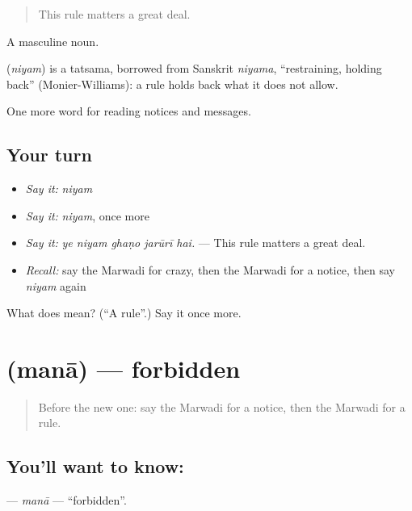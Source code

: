 \begin{quote}
This rule matters a great deal.
\end{quote}

A masculine noun.

\begin{cousinweb}
\textbf{} (\emph{niyam}) is a tatsama, borrowed from Sanskrit \emph{niyama}, \textquotedblleft{}restraining, holding back\textquotedblright{} (Monier-Williams): a rule holds back what it does not allow.
\end{cousinweb}

\begin{grammarlens}[title={What you've built}]
One more word for reading notices and messages.
\end{grammarlens}

\subsection*{Your turn}
\begin{itemize}
\raggedright
  \item \emph{Say it:} \emph{niyam}
  \item \emph{Say it:} \emph{niyam}, once more
  \item \emph{Say it:} \emph{ye niyam ghaṇo jarūrī hai.} — This rule matters a great deal.
  \item \emph{Recall:} say the Marwadi for crazy, then the Marwadi for a notice, then say \emph{niyam} again
\end{itemize}

\begin{tcolorbox}[breakable,colback=teal!4,colframe=teal!35!black,title={Before you move on}]
What does  mean? (\textquotedblleft{}A rule\textquotedblright{}.) Say it once more.
\end{tcolorbox}
\section[\texorpdfstring{\mw{मना} (manā)}{मना (manā)}]{ (manā) — forbidden}

\label{lesson:MW-C191-mana}



\begin{quote}
Before the new one: say the Marwadi for a notice, then the Marwadi for a rule.
\end{quote}

\subsection*{You'll want to know: }
\textbf{} — \emph{manā} — \textquotedblleft{}forbidden\textquotedblright{}.

